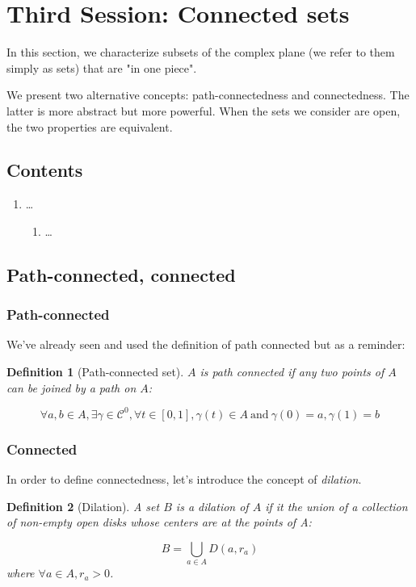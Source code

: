 \documentclass{article}
\newtheorem*{defi}{Definition}
\begin{document}
\newpage
\section{Third Session: Connected sets}
In this section, we characterize subsets of the complex plane (we refer to them simply as sets) that are "in one piece".

We present two alternative concepts: path-connectedness and connectedness. The latter is more abstract but more powerful. When the sets we consider are open, the two properties are equivalent.

\subsection*{Contents}
\begin{enumerate}
    \item \dots
        \begin{enumerate}
            \item \dots
        \end{enumerate}
\end{enumerate}

\subsection{Path-connected, connected}

\subsubsection{Path-connected}
We've already seen and used the definition of path connected but as a reminder:
\begin{defi}[Path-connected set]
   $A$ is path connected if any two points of $A$ can be joined by a path on $A$:

   $$\forall a,b\in A, \exists \gamma\in\mathcal{C}^0, \forall t\in[0,1], \gamma(t)\in A~\mathrm{ and}~\gamma(0) = a, \gamma(1) = b$$
\end{defi}

\subsubsection{Connected}
In order to define connectedness, let's introduce the concept of \emph{dilation}.

\begin{defi}[Dilation]
    A set $B$ is a dilation of $A$ if it the union of a collection of non-empty open disks whose centers are at the points of A:

    $$ B = \bigcup_{a\in A}{D(a, r_a)} $$
    where $\forall a\in A, r_a > 0$.
\end{defi}
\end{document}
